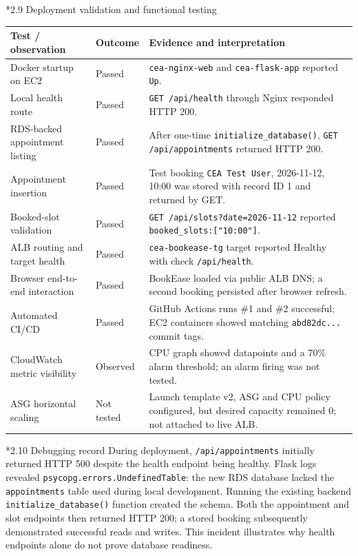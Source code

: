 \documentclass[10pt,a4paper]{article}
\makeatletter
\renewcommand{\subsection}{\@startsection{subsection}{2}{0pt}{7pt}{3pt}{\normalfont\normalsize\bfseries\color{navy}}}
\makeatother
\begin{document}
\subsection*{2.9 Deployment validation and functional testing}
\begin{tabularx}{\linewidth}{@{}p{51mm}p{22mm}X@{}}
\toprule
\textbf{Test / observation} & \textbf{Outcome} & \textbf{Evidence and interpretation}\\
\midrule
Docker startup on EC2 & Passed & \texttt{cea-nginx-web} and \texttt{cea-flask-app} reported \texttt{Up}.\\
Local health route & Passed & \texttt{GET /api/health} through Nginx responded HTTP 200.\\
RDS-backed appointment listing & Passed & After one-time \texttt{initialize\_database()}, \texttt{GET /api/appointments} returned HTTP 200.\\
Appointment insertion & Passed & Test booking \texttt{CEA Test User}, 2026-11-12, 10:00 was stored with record ID 1 and returned by GET.\\
Booked-slot validation & Passed & \texttt{GET /api/slots?date=2026-11-12} reported \texttt{booked\_slots:["10:00"]}.\\
ALB routing and target health & Passed & \texttt{cea-bookease-tg} target reported Healthy with check \texttt{/api/health}.\\
Browser end-to-end interaction & Passed & BookEase loaded via public ALB DNS; a second booking persisted after browser refresh.\\
Automated CI/CD & Passed & GitHub Actions runs \#1 and \#2 successful; EC2 containers showed matching \texttt{abd82dc...} commit tags.\\
CloudWatch metric visibility & Observed & CPU graph showed datapoints and a 70\% alarm threshold; an alarm firing was not tested.\\
ASG horizontal scaling & Not tested & Launch template v2, ASG and CPU policy configured, but desired capacity remained 0; not attached to live ALB.\\
\bottomrule
\end{tabularx}

\subsection*{2.10 Debugging record}
During deployment, \texttt{/api/appointments} initially returned HTTP 500 despite the health endpoint being healthy. Flask logs revealed \texttt{psycopg.errors.UndefinedTable}: the new RDS database lacked the \texttt{appointments} table used during local development. Running the existing backend \texttt{initialize\_database()} function created the schema. Both the appointment and slot endpoints then returned HTTP 200; a stored booking subsequently demonstrated successful reads and writes. This incident illustrates why health endpoints alone do not prove database readiness.
\end{document}

